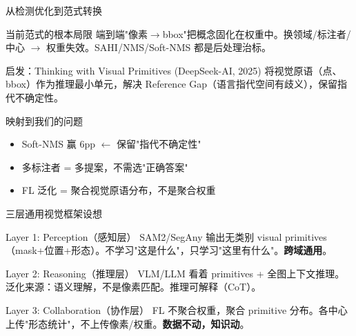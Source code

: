 \documentclass[aspectratio=169, 10pt]{beamer}
\begin{document}
\begin{frame}{从检测优化到范式转换}
  \begin{block}{当前范式的根本局限}
    端到端"像素$\rightarrow$bbox"把概念固化在权重中。换领域/标注者/中心 $\rightarrow$ 权重失效。SAHI/NMS/Soft-NMS 都是后处理治标。
  \end{block}
  \vspace{0em}
  \begin{alertblock}{启发：Thinking with Visual Primitives (DeepSeek-AI, 2025)}
    将视觉原语（点、bbox）作为推理最小单元，解决 Reference Gap（语言指代空间有歧义），保留指代不确定性。
  \end{alertblock}
  \vspace{0em}
  \begin{block}{映射到我们的问题}
    \begin{itemize}
      \item Soft-NMS 赢 6pp $\leftarrow$ 保留"指代不确定性"
      \item 多标注者 = 多提案，不需选"正确答案"
      \item FL 泛化 = 聚合视觉原语分布，不是聚合权重
    \end{itemize}
  \end{block}
\end{frame}

\begin{frame}{三层通用视觉框架设想}
  \begin{block}{Layer 1: Perception（感知层）}
    SAM2/SegAny 输出无类别 visual primitives（mask+位置+形态）。不学习"这是什么"，只学习"这里有什么"。\textbf{跨域通用}。
  \end{block}
  \vspace{0em}
  \begin{block}{Layer 2: Reasoning（推理层）}
    VLM/LLM 看着 primitives + 全图上下文推理。泛化来源：语义理解，不是像素匹配。推理可解释（CoT）。
  \end{block}
  \vspace{0em}
  \begin{block}{Layer 3: Collaboration（协作层）}
    FL 不聚合权重，聚合 primitive 分布。各中心上传"形态统计"，不上传像素/权重。\textbf{数据不动，知识动}。
  \end{block}
\end{frame}
\end{document}
